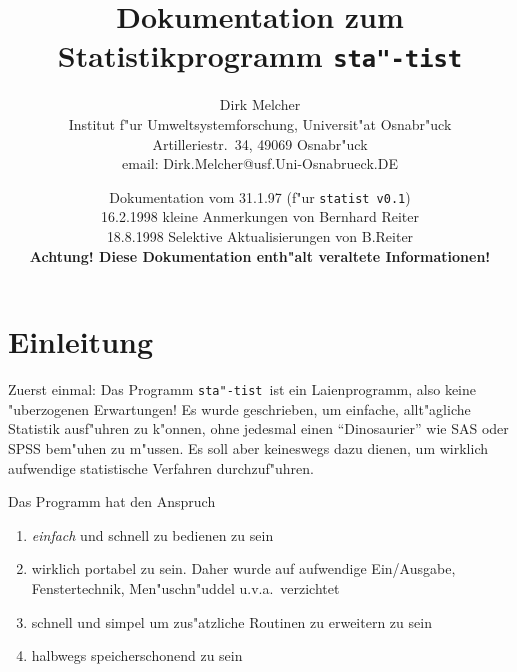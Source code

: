 \documentclass[a4paper,11pt]{article}
\newcommand{\st}{{\tt sta"-tist}}
\begin{document}
\title{Dokumentation zum Statistikprogramm \st}
\author{Dirk Melcher\\
  Institut f"ur Umweltsystemforschung, Universit"at Osnabr"uck\\
  Artilleriestr.\ 34, 49069 Osnabr"uck\\
  email:  Dirk.Melcher@usf.Uni-Osnabrueck.DE}
\date{Dokumentation vom 31.1.97 (f"ur {\tt statist v0.1})\\
	{\small 16.2.1998 kleine Anmerkungen von Bernhard Reiter\\
		18.8.1998 Selektive Aktualisierungen von B.Reiter
	}\\
        {\bf Achtung! Diese Dokumentation enth"alt 
	veraltete Informationen!}
     }
\maketitle



\section{Einleitung}
\label{sec:einleitung}

Zuerst einmal: Das Programm \st\ ist ein Laienprogramm, also keine
"uberzogenen Erwartungen! Es wurde geschrieben, um einfache,
allt"agliche Statistik ausf"uhren zu k"onnen, ohne jedesmal einen
"`Dinosaurier"' wie SAS oder SPSS bem"uhen zu m"ussen. Es soll aber
keineswegs dazu dienen, um wirklich aufwendige statistische Verfahren
durchzuf"uhren.


Das Programm hat den Anspruch
\begin{enumerate}
\item {\em einfach\/} und schnell zu bedienen zu sein
\item wirklich portabel zu sein. Daher wurde auf aufwendige
  Ein/Ausgabe, Fenstertechnik, Men"uschn"uddel u.v.a.\ verzichtet
\item schnell und simpel um zus"atzliche Routinen zu erweitern zu sein
\item halbwegs speicherschonend zu sein
\end{enumerate}
\end{document}
